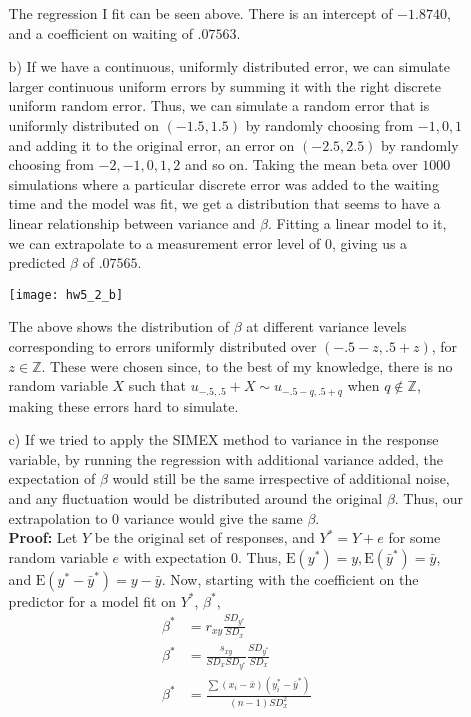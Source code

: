 \documentclass[11pt]{article}
\newcommand{\Z}{\mathbb{Z}}
\newcommand{\E}{\mathrm{E}}
\theoremstyle{definition}
\begin{document}
\begin{itemize}
\begin{itemize}
                The regression I fit can be seen above. There is an intercept of $-1.8740$, and a coefficient on waiting of $.07563$.
            \item[b)]
                If we have a continuous, uniformly distributed error, we can simulate larger continuous uniform errors by summing it with the right discrete uniform random error. Thus, we can simulate a random error that is uniformly distributed on $(-1.5,1.5)$ by randomly choosing from ${-1,0,1}$ and adding it to the original error, an error on $(-2.5,2.5)$ by randomly choosing from ${-2,-1,0,1,2}$ and so on. Taking the mean beta over $1000$ simulations where a particular discrete error was added to the waiting time and the model was fit, we get a distribution that seems to have a linear relationship between variance and $\beta$. Fitting a linear model to it, we can extrapolate to a measurement error level of $0$, giving us a predicted $\beta$ of $.07565$.
                \begin{center}
                    \texttt{[image: hw5\_2\_b]}
                \end{center}
                The above shows the distribution of $\beta$ at different variance levels corresponding to errors uniformly distributed over $(-.5-z,.5+z)$, for $z\in\Z$. These were chosen since, to the best of my knowledge, there is no random variable $X$ such that \(u_{-.5,.5}+X \sim u_{-.5-q,.5+q}\) when $q\not\in\Z$, making these errors hard to simulate.
            \item[c)] If we tried to apply the SIMEX method to variance in the response variable, by running the regression with additional variance added, the expectation of $\beta$ would still be the same irrespective of additional noise, and any fluctuation would be distributed around the original $\beta$. Thus, our extrapolation to $0$ variance would give the same $\beta$. \\
                {\bf Proof:} Let $Y$ be the original set of responses, and $Y^*=Y+e$ for some random variable $e$ with expectation $0$. Thus, \(\E(y^*)=y,\E(\bar y^*) = \bar y\), and \(\E(y^*-\bar y^*) = y -\bar y\). Now, starting with the coefficient on the predictor for a model fit on $Y^*$, $\beta^*$,
                \begin{align*}
                    \beta^* &= r_{xy}\frac{SD_{y^*}}{SD_x} \\
                    \beta^* &= \frac{s_{xy}}{SD_x SD_{y^*}}\frac{SD_{y^*}}{SD_x} \\
                    \beta^* &= \frac{\sum(x_i-\bar x)(y_i^*-\bar y^*)}{(n-1)SD_x^2}\\

\end{align*}
\end{itemize}
\end{itemize}
\end{document}
